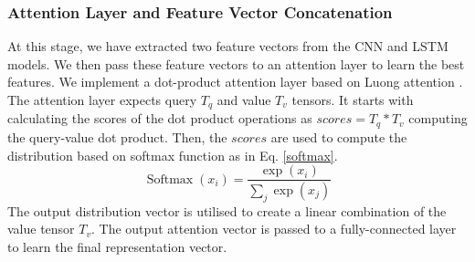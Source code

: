 \documentclass[conference]{IEEEtran}
\begin{document}
\subsubsection{Attention Layer and Feature Vector Concatenation}
At this stage, we have extracted two feature vectors from the CNN and LSTM models. We then pass these feature vectors to an attention layer to learn the best features. We implement a dot-product attention layer based on Luong attention \cite{luong2015effective}. The attention layer expects query $T_q$ and value $T_v$ tensors. It starts with calculating the scores of the dot product operations as $scores = T_q * T_v$ computing the query-value dot product. Then, the $scores$ are used to compute the distribution based on softmax function as in Eq. \ref{softmax}. 
\begin{equation}\label{softmax}
    \operatorname{Softmax}\left(x_{i}\right)=\frac{\exp \left(x_{i}\right)}{\sum_{j} \exp \left(x_{j}\right)}
\end{equation}
The output distribution vector is utilised to create a linear combination of the value tensor $T_v$. The output attention vector is passed to a fully-connected layer to learn the final representation vector.
\end{document}
